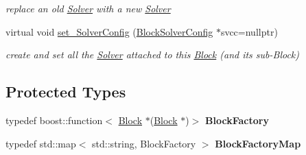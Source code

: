 \begin{Indent}
\begin{DoxyCompactItemize}
\begin{DoxyCompactList}\small\item\em replace an old \mbox{\hyperlink{class_s_m_spp__di__unipi__it_1_1_solver}{Solver}} with a new \mbox{\hyperlink{class_s_m_spp__di__unipi__it_1_1_solver}{Solver}} \end{DoxyCompactList}\item 
virtual void \mbox{\hyperlink{class_s_m_spp__di__unipi__it_1_1_block_a40a2bbe11fbdf470e474f6638fefa66f}{set\+\_\+\+Solver\+Config}} (\mbox{\hyperlink{class_s_m_spp__di__unipi__it_1_1_block_solver_config}{Block\+Solver\+Config}} $\ast$svcc=nullptr)
\begin{DoxyCompactList}\small\item\em create and set all the \mbox{\hyperlink{class_s_m_spp__di__unipi__it_1_1_solver}{Solver}} attached to this \mbox{\hyperlink{class_s_m_spp__di__unipi__it_1_1_block}{Block}} (and its sub-\/\+Block) \end{DoxyCompactList}\end{DoxyCompactItemize}
\end{Indent}
\subsection*{Protected Types}
\begin{DoxyCompactItemize}
\item 
\mbox{\label{class_s_m_spp__di__unipi__it_1_1_block_a756ed146dc9ebfe86e51016e6e33257a}} 
typedef boost\+::function$<$ \mbox{\hyperlink{class_s_m_spp__di__unipi__it_1_1_block}{Block}} $\ast$(\mbox{\hyperlink{class_s_m_spp__di__unipi__it_1_1_block}{Block}} $\ast$)$>$ {\bfseries Block\+Factory}
\item 
\mbox{\label{class_s_m_spp__di__unipi__it_1_1_block_a5ad7384603ebe0579b28059574906fbf}} 
typedef std\+::map$<$ std\+::string, Block\+Factory $>$ {\bfseries Block\+Factory\+Map}
\end{DoxyCompactItemize}
